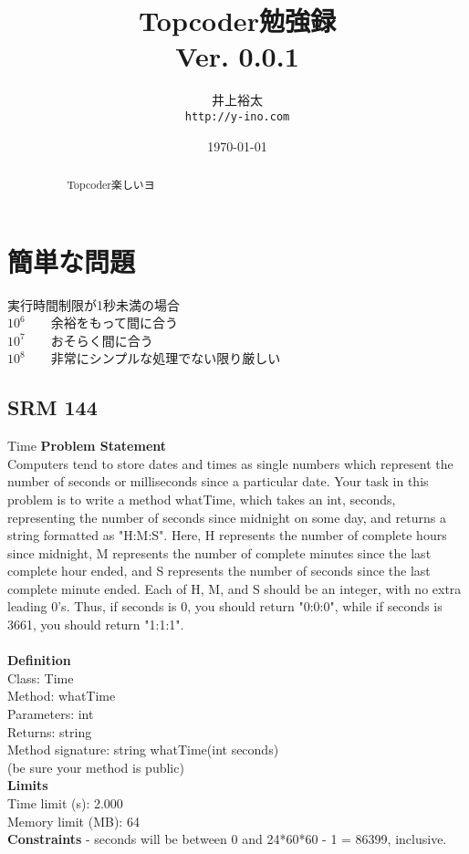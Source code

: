 \documentclass[a4j,10pt,oneside,openany]{jsbook}
\title{{\Huge \textbf{Topcoder勉強録}}\\ {\small Ver. 0.0.1}}
\author{井上裕太\\ \texttt{http://y-ino.com}}
\date{\today}
\begin{document}
\begin{abstract}
~~~~~~~Topcoder楽しいヨ
\end{abstract}
%
%
\maketitle
\frontmatter
\tableofcontents
%
%
\mainmatter
\chapter{簡単な問題}
実行時間制限が1秒未満の場合\\
$10^6$~~~~余裕をもって間に合う\\
$10^7$~~~~おそらく間に合う\\
$10^8$~~~~非常にシンプルな処理でない限り厳しい\\
\section{SRM 144}
\begin{breakitembox}[l]{Time}
{\bf Problem Statement}\\
Computers tend to store dates and times as single numbers which represent the number of seconds or milliseconds since a particular date. Your task in this problem is to write a method whatTime, which takes an int, seconds, representing the number of seconds since midnight on some day, and returns a string formatted as "H:M:S". Here, H represents the number of complete hours since midnight, M represents the number of complete minutes since the last complete hour ended, and S represents the number of seconds since the last complete minute ended. Each of H, M, and S should be an integer, with no extra leading 0's. Thus, if seconds is 0, you should return "0:0:0", while if seconds is 3661, you should return "1:1:1".\\\\
{\bf Definition}\\
Class: Time\\
Method: whatTime\\
Parameters: int\\
Returns: string\\
Method signature: string whatTime(int seconds)\\
(be sure your method is public)\\
{\bf Limits}\\
Time limit (s): 2.000\\
Memory limit (MB): 64\\
{\bf Constraints}
- seconds will be between 0 and 24*60*60 - 1 = 86399, inclusive.\\
\end{breakitembox}
\end{document}
